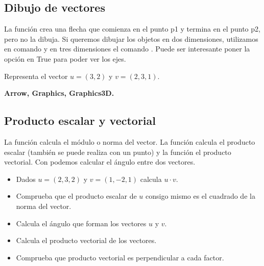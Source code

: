 \documentclass[a4paper,10pt, draft]{article}
\newcommand{\com}[1]{\textbf{\color{blue}{#1}}}
\newenvironment{ejer}{\begin{tcolorbox}[center title, title=Ejercicios,
fonttitle=\sffamily\bfseries,colback=blue!5,colframe=orange]}{\end{tcolorbox}}
\newenvironment{funciones}{\begin{tcolorbox}[center title, title=Nuevas funciones, fonttitle=\sffamily\bfseries, colback=green!5!white,colframe=red!75!black]}{\end{tcolorbox}\bigskip}
\begin{document}
\newpage


\subsection{Dibujo de vectores}

 La función \com{Arrow[\{p1,p2\}]} crea una flecha que comienza en el punto p1 y termina en el punto p2, pero no la dibuja. Si queremos dibujar los objetos  en dos dimensiones, utilizamos en comando \com{Graphics} y en tres dimensiones el comando \com{Graphics3D}. Puede ser interesante poner la opción \com{Axes} en True para poder ver los ejes.

\begin{ejer}

Representa el vector $u=(3,2)$ y $v=(2,3,1)$.


\end{ejer}

\begin{funciones}


\textbf{Arrow, Graphics, Graphics3D.}


\end{funciones}





\newpage

\subsection{Producto escalar y vectorial}

La función \com{Norm[u]} calcula el módulo o norma del vector. La función \com{Dot[u,v]} calcula el producto escalar (también se puede realiza con un punto) y la función \com{Cross[u,v]} el producto vectorial. Con \com{VectorAngle[u,v]} podemos calcular el ángulo entre dos vectores.

\begin{ejer}

\begin{itemize}

\item Dados $u=(2,3,2)$ y $v=(1,-2,1)$  calcula $u\cdot v$.

\item Comprueba que el producto escalar de $u$ consigo mismo es el cuadrado de la norma del vector.

\item Calcula el ángulo que forman los vectores $u$ y $v$.


\item Calcula el producto vectorial de los vectores.

\item Comprueba que producto vectorial  es perpendicular a cada factor.

\end{itemize}

\end{ejer}  
\end{document}
